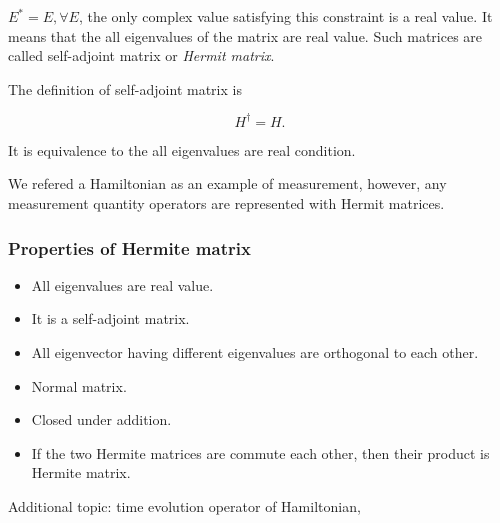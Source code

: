 \documentclass[10pt]{article}
\begin{document}
$E^{\ast} = E, \forall E$, the only complex value satisfying this constraint is a real value.
It means that the all eigenvalues of the matrix are real value.
Such matrices are called self-adjoint matrix or \textit{Hermit matrix}.

The definition of self-adjoint matrix is 

\begin{equation}
    H^\dagger = H .
\end{equation}

It is equivalence to the all eigenvalues are real condition.

We refered a Hamiltonian as an example of measurement, 
however, any measurement quantity operators are represented with Hermit matrices.

\subsubsection{Properties of Hermite matrix}

\begin{itemize}
    \item All eigenvalues are real value.
    \item It is a self-adjoint matrix.
    \item All eigenvector having different eigenvalues are orthogonal to each other.
    \item Normal matrix.
    \item Closed under addition.
    \item If the two Hermite matrices are commute each other, then their product is Hermite matrix.
\end{itemize}

Additional topic: time evolution operator of Hamiltonian,
\end{document}
